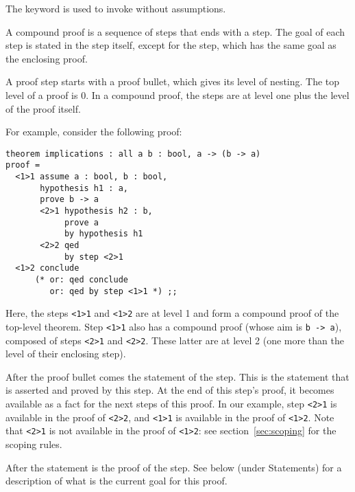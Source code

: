 The  keyword is used to invoke {\zenon} without
assumptions.

A compound proof is a sequence of steps that ends with a 
step.  The goal of each step is stated in the step itself, except for
the  step, which has the same goal as the enclosing
proof.

\begin{syn}
 \is
       
\end{syn}


A proof step starts with a proof bullet, which gives its level of
nesting.  The top level of a proof is 0.  In a compound proof, the
steps are at level one plus the level of the proof itself.

\goodbreak
For example, consider the following proof:

{\scriptsize
\begin{lstlisting}
theorem implications : all a b : bool, a -> (b -> a)
proof =
  <1>1 assume a : bool, b : bool,
       hypothesis h1 : a,
       prove b -> a
       <2>1 hypothesis h2 : b,
            prove a
            by hypothesis h1
       <2>2 qed
            by step <2>1
  <1>2 conclude
      (* or: qed conclude
         or: qed by step <1>1 *) ;;
\end{lstlisting}}

Here, the steps \verb"<1>1" and \verb"<1>2" are at level 1
and form a compound proof of the top-level theorem.  Step \verb"<1>1"
also has a compound proof (whose aim is \verb"b -> a"), composed of
steps \verb"<2>1" 
and \verb"<2>2".  These latter are at level 2 (one more than the level of
their enclosing step).

After the proof bullet comes the statement of the step.  This is the
statement that is asserted and proved by this step.  At the end of
this step's proof, it becomes available as a fact for the next steps
of this proof.  In our example, step \verb"<2>1" is available in the
proof of \verb"<2>2", and \verb"<1>1" is available in the proof of
\verb"<1>2".  Note that \verb"<2>1" is not available in the proof of
\verb"<1>2": see section~\ref{sec:scoping} for the scoping rules.

After the statement is the proof of the step.  See below (under
Statements) for a description of what is the current goal for this
proof.

